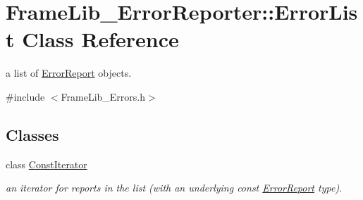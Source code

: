 \hypertarget{class_frame_lib___error_reporter_1_1_error_list}{}\section{Frame\+Lib\+\_\+\+Error\+Reporter\+:\+:Error\+List Class Reference}
\label{class_frame_lib___error_reporter_1_1_error_list}


a list of \hyperlink{class_frame_lib___error_reporter_1_1_error_report}{Error\+Report} objects.  




{\ttfamily \#include $<$Frame\+Lib\+\_\+\+Errors.\+h$>$}

\subsection*{Classes}
\begin{DoxyCompactItemize}
\item 
class \hyperlink{class_frame_lib___error_reporter_1_1_error_list_1_1_const_iterator}{Const\+Iterator}
\begin{DoxyCompactList}\small\item\em an iterator for reports in the list (with an underlying const \hyperlink{class_frame_lib___error_reporter_1_1_error_report}{Error\+Report} type). \end{DoxyCompactList}\end{DoxyCompactItemize}
